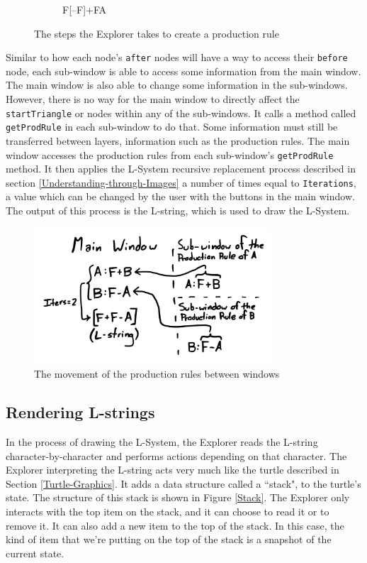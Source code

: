 \documentclass[12pt,twoside]{reedthesis}
\newcommand{\code}[1]{\texttt{#1}}
\begin{document}
\begin{figure}[H]
\begin{subfigure}{0.3\textwidth}
		\caption{F[–F]+FA}
	\end{subfigure}
	\caption{The steps the Explorer takes to create a production rule}
	\label{RuleMaking}
	\end{figure}
	
	Similar to how each node's \code{after} nodes will have a way to access their \code{before} node, each sub-window is able to access some information from the main window. The main window is also able to change some information in the sub-windows. However, there is no way for the main window to directly affect the \code{startTriangle} or nodes within any of the sub-windows. It calls a method called \code{getProdRule} in each sub-window to do that. Some information must still be transferred between layers, information such as the production rules. The main window accesses the production rules from each sub-window's \code{getProdRule} method. It then applies the L-System recursive replacement process described in section \ref{Understanding-through-Images} a number of times equal to \code{Iterations}, a value which can be changed by the user with the buttons in the main window. The output of this process is the L-string, which is used to draw the L-System.
	
	
	\begin{figure}[H]
	\centering
	\includegraphics[height=2in, frame]{Images/Diagram11}
	\caption{The movement of the production rules between windows}
	\label {Strings}
	\end{figure}
	
\subsection{Rendering L-strings}
\label{Rendering}
	In the process of drawing the L-System, the Explorer reads the L-string character-by-character and performs actions depending on that character. The Explorer interpreting the L-string acts very much like the turtle described in Section \ref{Turtle-Graphics}. It adds a data structure called a ``stack", to the turtle's state. The structure of this stack is shown in Figure \ref{Stack}. The Explorer only interacts with the top item on the stack, and it can choose to read it or to remove it. It can also add a new item to the top of the stack. In this case, the kind of item that we're putting on the top of the stack is a snapshot of the current state.
	
\end{document}
